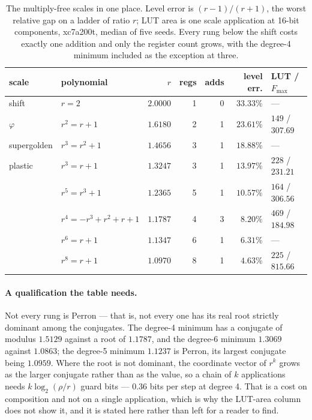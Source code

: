 \documentclass[11pt]{article}
\theoremstyle{definition}
\begin{document}
\begin{table}[t]\centering
\caption{The multiply-free scales in one place. Level error is $(r-1)/(r+1)$,
the worst relative gap on a ladder of ratio $r$; LUT area is one scale
application at 16-bit components, xc7a200t, median of five seeds. Every rung
below the shift costs exactly one addition and only the register count grows, with the degree-4 minimum included as the exception at three.}
\label{tab:allscales}
\begin{tabular}{llrrrrl}
\toprule
scale & polynomial & $r$ & regs & adds & level err. & LUT / $F_{\max}$ \\
\midrule
shift        & $r=2$              & $2.0000$ & 1 & 0 & $33.33\%$ & --- \\
$\varphi$    & $r^2=r+1$          & $1.6180$ & 2 & 1 & $23.61\%$ & $149$ / $307.69$ \\
supergolden  & $r^3=r^2+1$        & $1.4656$ & 3 & 1 & $18.88\%$ & --- \\
plastic      & $r^3=r+1$          & $1.3247$ & 3 & 1 & $13.97\%$ & $228$ / $231.21$ \\
             & $r^5=r^3+1$        & $1.2365$ & 5 & 1 & $10.57\%$ & $164$ / $306.56$ \\
             & $r^4{=}{-}r^3{+}r^2{+}r{+}1$ & $1.1787$ & 4 & 3 & $8.20\%$ & $469$ / $184.98$ \\
             & $r^6=r+1$          & $1.1347$ & 6 & 1 & $6.31\%$ & --- \\
             & $r^8=r+1$          & $1.0970$ & 8 & 1 & $4.63\%$ & $225$ / $815.66$ \\
\bottomrule
\end{tabular}
\end{table}

\paragraph{A qualification the table needs.} Not every rung is Perron --- that
is, not every one has its real root strictly dominant among the conjugates. The
degree-4 minimum has a conjugate of modulus $1.5129$ against a root of
$1.1787$, and the degree-6 minimum $1.3069$ against $1.0863$; the degree-5
minimum $1.1237$ is Perron, its largest conjugate being $1.0959$. Where the
root is not dominant, the coordinate vector of $r^{k}$ grows as the larger
conjugate rather than as the value, so a chain of $k$ applications needs
$k\log_2(\rho/r)$ guard bits --- $0.36$ bits per step at degree 4. That is a cost
on composition and not on a single application, which is why the LUT-area column
does not show it, and it is stated here rather than left for a reader to find.
\end{document}
